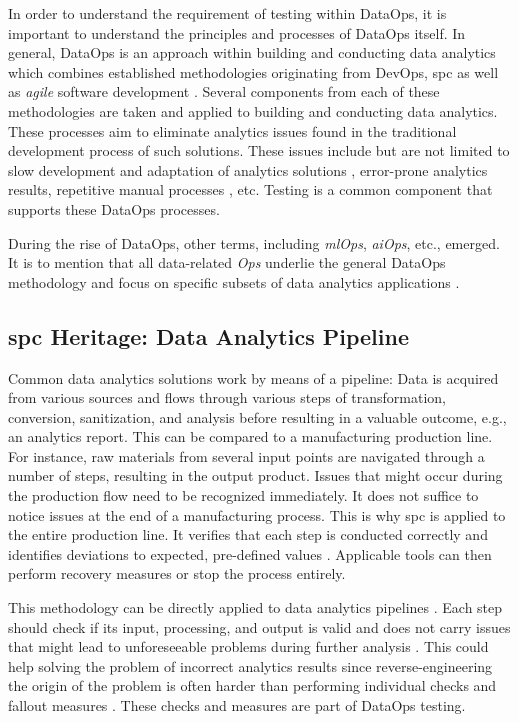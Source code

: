 In order to understand the requirement of testing within DataOps, it is important to understand the principles and processes of DataOps itself. In general, DataOps is an approach within building and conducting data analytics which combines established methodologies originating from DevOps, \ac{spc} as well as \textit{agile} software development \cite[24]{Bergh2019}. Several components from each of these methodologies are taken and applied to building and conducting data analytics. These processes aim to eliminate analytics issues found in the traditional development process of such solutions. These issues include but are not limited to slow development and adaptation of analytics solutions \cite{Lockner2019}, error-prone analytics results, repetitive manual processes \cite[11\psqq]{Bergh2019}, etc. Testing is a common component that supports these DataOps processes.

During the rise of DataOps, other terms, including \textit{\acs{ml}Ops}, \textit{\acs{ai}Ops}, etc., emerged. It is to mention that all data-related \textit{Ops} underlie the general DataOps methodology and focus on specific subsets of data analytics applications \cite{Aslett2018}.

\subsection{\acs{spc} Heritage: Data Analytics Pipeline}
Common data analytics solutions work by means of a pipeline: Data is acquired from various sources and flows through various steps of transformation, conversion, sanitization, and analysis before resulting in a valuable outcome, e.g., an analytics report. This can be compared to a manufacturing production line. For instance, raw materials from several input points are navigated through a number of steps, resulting in the output product. Issues that might occur during the production flow need to be recognized immediately. It does not suffice to notice issues at the end of a manufacturing process. This is why \acf{spc} is applied to the entire production line. It verifies that each step is conducted correctly and identifies deviations to expected, pre-defined values \cite[1]{Knoth2002}. Applicable tools can then perform recovery measures or stop the process entirely.

This methodology can be directly applied to data analytics pipelines \cite[27]{Bergh2019}. Each step should check if its input, processing, and output is valid and does not carry issues that might lead to unforeseeable problems during further analysis \cite{DataKitchen2020a}. This could help solving the problem of incorrect analytics results since reverse-engineering the origin of the problem is often harder than performing individual checks and fallout measures \cite{Redman2020}. These checks and measures are part of DataOps testing.

